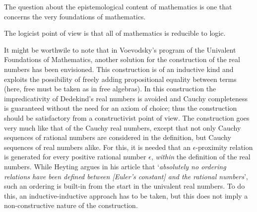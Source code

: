 \documentclass{article}
\begin{document}
\maketitle

The question about the epistemological content of mathematics is one that concerns the very foundations of mathematics.

The logicist point of view is that all of mathematics is reducible to logic.

It might be worthwile to note that in Voevodsky's program of the Univalent Foundations of Mathematics, another solution for the construction of the real numbers has been envisioned. This construction is of an inductive kind and exploits the possibility of freely adding propositional equality between terms (here, free must be taken as in free algebras). In this construction the impredicativity of Dedekind's real numbers is avoided and Cauchy completeness is guaranteed without the need for an axiom of choice; thus the construction should be satisfactory from a constructivist point of view. The construction goes very much like that of the Cauchy real numbers, except that not only Cauchy sequences of rational numbers are considered in the definition, but Cauchy sequences of real numbers alike. For this, it is needed that an $\epsilon$-proximity relation is generated for every positive rational number $\epsilon$, \emph{within} the definition of the real numbers. While Heyting argues in his article that `\emph{absolutely no ordering relations have been defined between [Euler's constant] and the rational numbers}', such an ordering is built-in from the start in the univalent real numbers. To do this, an inductive-inductive approach has to be taken, but this does not imply a non-constructive nature of the construction.
\end{document}
